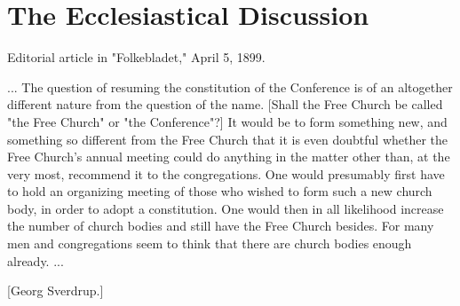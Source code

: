 
\section{The Ecclesiastical Discussion}

Editorial article in "Folkebladet," April 5, 1899.

... The question of resuming the constitution of the Conference is of an altogether different nature from the question of the name. [Shall the Free Church be called "the Free Church" or "the Conference"?] It would be to form something new, and something so different from the Free Church that it is even doubtful whether the Free Church’s annual meeting could do anything in the matter other than, at the very most, recommend it to the congregations. One would presumably first have to hold an organizing meeting of those who wished to form such a new church body, in order to adopt a constitution. One would then in all likelihood increase the number of church bodies and still have the Free Church besides. For many men and congregations seem to think that there are church bodies enough already. ...

[Georg Sverdrup.]